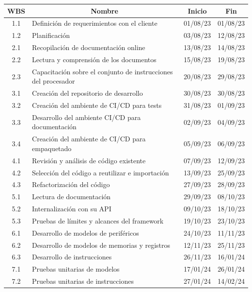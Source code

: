 \begin{table}[ht]
  \begin{tabularx}{\linewidth}{@{}|c|X|c|c|@{}}
    \hline
    \rowcolor[HTML]{C0C0C0}
    WBS & \multicolumn{1}{c|}{\cellcolor[HTML]{C0C0C0}Nombre} & Inicio  & Fin     \\ \hline
    1.1 & Definición de requerimientos con el cliente & 01/08/23 & 01/08/23 \\ \hline
    1.2 & Planificación & 03/08/23 & 12/08/23 \\ \hline
    2.1 & Recopilación de documentación online & 13/08/23 & 14/08/23\\ \hline
    2.2 & Lectura y comprensión de los documentos & 15/08/23 & 19/08/23\\ \hline
    2.3 & Capacitación sobre el conjunto de instrucciones del procesador & 20/08/23 & 29/08/23\\ \hline
    3.1 & Creación del repositorio de desarrollo & 30/08/23 & 30/08/23\\ \hline
    3.2 & Creación del ambiente de CI/CD para tests & 31/08/23 & 01/09/23\\ \hline
    3.3 & Desarrollo  del ambiente CI/CD para documentación & 02/09/23 & 04/09/23\\ \hline
    3.4 & Creación del ambiente de CI/CD para empaquetado & 05/09/23 & 06/09/23\\ \hline
    4.1 & Revisión y análisis de código existente & 07/09/23 & 12/09/23\\ \hline
    4.2 & Selección del código a reutilizar e importación & 13/09/23 & 25/09/23\\ \hline
    4.3 & Refactorización del código & 27/09/23 & 28/09/23\\ \hline
    5.1 & Lectura de documentación & 29/09/23 & 08/10/23\\ \hline
    5.2 & Internalización con su API & 09/10/23 & 18/10/23\\ \hline
    5.3 & Pruebas de límites y alcances del framework & 19/10/23 & 23/10/23\\ \hline
    6.1 & Desarrollo de modelos de periféricos & 24/10/23 & 11/11/23\\ \hline
    6.2 & Desarrollo de modelos de memorias y registros & 12/11/23 & 25/11/23\\ \hline
    6.3 & Desarrollo de instrucciones & 26/11/23 & 16/01/24\\ \hline
    7.1 & Pruebas unitarias de modelos & 17/01/24 & 26/01/24\\ \hline
    7.2 & Pruebas unitarias de instrucciones & 27/01/24 & 14/02/24\\ \hline

\end{tabularx}
\end{table}
